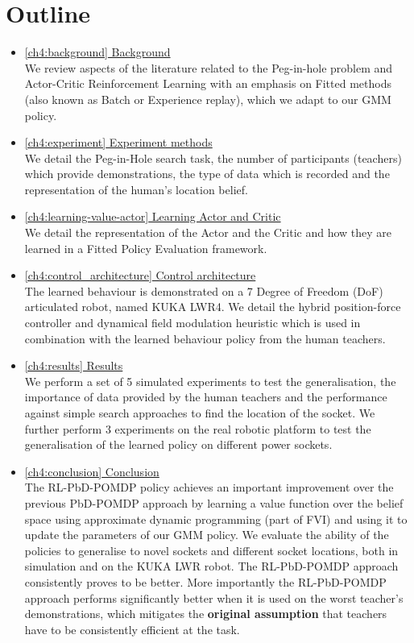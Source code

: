 \section{Outline}
\begin{itemize}
  \item \hyperref[ch4:background]{\ref{ch4:background}   Background}\\
  We review aspects of the literature related to the Peg-in-hole problem and Actor-Critic Reinforcement Learning 
  with an emphasis on Fitted methods (also known as Batch or Experience replay), which we adapt to our GMM policy.
  \item \hyperref[ch4:experiment]{\ref{ch4:experiment}   Experiment methods}\\
  We detail the Peg-in-Hole search task, the number of participants (teachers) which provide demonstrations, the 
  type of data which is recorded and the representation of the human's location belief.
  \item \hyperref[ch4:learning-value-actor]{\ref{ch4:learning-value-actor} Learning Actor and Critic}\\
  We detail the representation of the Actor and the Critic and how they are learned in a Fitted Policy Evaluation 
  framework.
  \item \hyperref[ch4:control_architecture]{\ref{ch4:control_architecture} Control architecture}\\
  The learned behaviour is demonstrated on a 7 Degree of Freedom (DoF) articulated robot, named KUKA LWR4. 
  We detail the hybrid position-force controller and dynamical field modulation heuristic which is used in 
  combination with the learned behaviour policy from the human teachers.
  \item \hyperref[ch4:results]{\ref{ch4:results}  	 Results}\\
  We perform a set of 5 simulated experiments to test the generalisation, the importance of data provided by the human 
  teachers and the performance against simple search approaches to find the location of the socket. We further perform 
  3 experiments on the real robotic platform to test the generalisation of the learned policy on different power sockets.
  \item \hyperref[ch4:conclusion]{\ref{ch4:conclusion} Conclusion}\\
  The RL-PbD-POMDP policy achieves an important improvement over the previous PbD-POMDP approach
   by learning a value function over the belief space using approximate dynamic programming (part of FVI) and using it 
   to update the parameters of our GMM policy. We evaluate the ability of the policies to generalise to novel sockets 
   and different socket locations, both in simulation and on the KUKA LWR robot.
   The RL-PbD-POMDP approach consistently proves to be better. More importantly the RL-PbD-POMDP approach performs 
   significantly better when it is used on the worst teacher's demonstrations, which mitigates the \textbf{original assumption} that 
   teachers have to be consistently efficient at the task.
\end{itemize}

